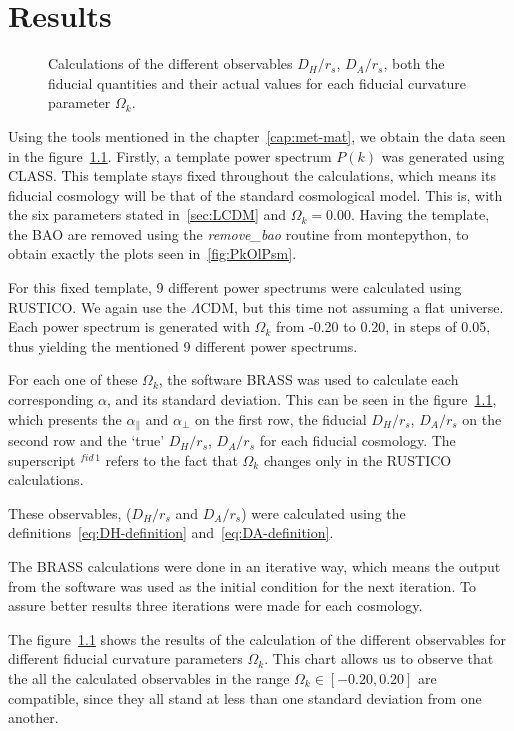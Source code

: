 \chapter{Results}


\begin{figure}[b]
	\centering
%
\resizebox{0.9\textwidth}{!}{}
	\caption{Calculations of the different observables $D_H /r_s$, $D_A /r_s$, both the fiducial quantities and their actual values for each fiducial curvature parameter $\Omega_k$.}
	\label{fig:DA_DH}
\end{figure}

Using the tools mentioned in the chapter~\ref{cap:met-mat}, we obtain the data seen in the figure~\ref{fig:DA_DH}. Firstly, a template power spectrum $P(k)$ was generated using CLASS. This template stays fixed throughout the calculations, which means its fiducial cosmology will be that of the standard cosmological model. This is, with the six parameters stated in~\ref{sec:LCDM} and $\Omega_k=0.00$. Having the template, the BAO are removed using the \textit{remove\_bao} routine from montepython, to obtain exactly the plots seen in~\ref{fig:PkOlPsm}.

For this fixed template, 9 different power spectrums were calculated using RUSTICO\@. We again use the $\Lambda$CDM, but this time not assuming a flat universe. Each power spectrum is generated with $\Omega_k$ from -0.20 to 0.20, in steps of 0.05, thus yielding the mentioned 9 different power spectrums.

For each one of these $\Omega_k$, the software BRASS was used to calculate each corresponding $\alpha$, and its standard deviation. This can be seen in the figure~\ref{fig:DA_DH}, which presents the $\alpha_\parallel$ and $\alpha_\perp$ on the first row, the fiducial $D_H / r_s$, $D_A/r_s $ on the second row and the `true' $D_H / r_s$, $D_A /r_s$ for each fiducial cosmology. The superscript $^{fid\, 1}$ refers to the fact that $\Omega_k$ changes only in the RUSTICO calculations. 

These observables, ($D_H /r_s$ and $D_A /r_s $) were calculated using the definitions~\eqref{eq:DH-definition} and~\eqref{eq:DA-definition}.

The BRASS calculations were done in an iterative way, which means the output from the software was used as the initial condition for the next iteration. To assure better results three iterations were made for each cosmology. 

The figure~\ref{fig:DA_DH} shows the results of the calculation of the different observables for different fiducial curvature parameters $\Omega_k$. This chart allows us to observe that the all the calculated observables in the range $\Omega_k  \in \left[ -0.20, 0.20   \right] $ are compatible, since they all stand at less than one standard deviation from one another.


